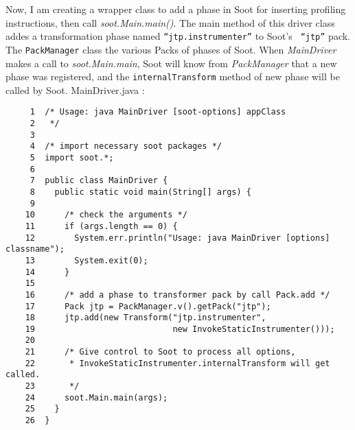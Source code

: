 \documentclass[12pt]{article}
\begin{document}
\noindent
Now, I am creating a wrapper class to add a phase in Soot for
inserting profiling instructions, then call {\em
soot.Main.main()}. The main method of this driver class addes a
transformation phase named {\tt ``jtp.instrumenter''} to Soot's {\tt
``jtp''} pack. The {\tt PackManager} class the various Packs of phases of Soot.
When {\em MainDriver} makes a call
to {\em soot.Main.main}, Soot will know from {\em PackManager} that a new
phase was registered, and the {\tt internalTransform} method of
new phase will be called by Soot.  
{\Large MainDriver.java :}
\begin{verbatim}
     1  /* Usage: java MainDriver [soot-options] appClass
     2   */
     3
     4  /* import necessary soot packages */
     5  import soot.*;
     6
     7  public class MainDriver {
     8    public static void main(String[] args) {
     9
    10      /* check the arguments */
    11      if (args.length == 0) {
    12        System.err.println("Usage: java MainDriver [options] classname");
    13        System.exit(0);
    14      }
    15
    16      /* add a phase to transformer pack by call Pack.add */
    17      Pack jtp = PackManager.v().getPack("jtp");
    18      jtp.add(new Transform("jtp.instrumenter",
    19                            new InvokeStaticInstrumenter()));
    20
    21      /* Give control to Soot to process all options,
    22       * InvokeStaticInstrumenter.internalTransform will get called.
    23       */
    24      soot.Main.main(args);
    25    }
    26  }
\end{verbatim}
\end{document}
